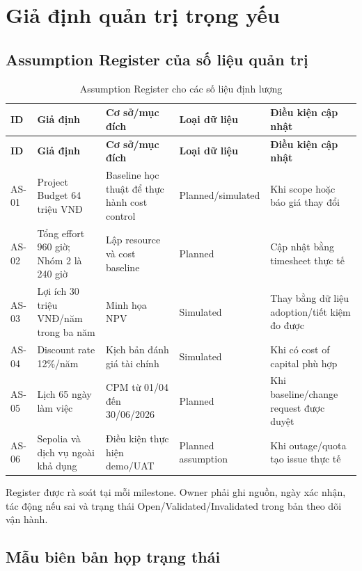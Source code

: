 \fi
\section{Giả định quản trị trọng yếu}

\subsection{Assumption Register của số liệu quản trị}

\begin{landscape}
\begin{longtable}{p{1.3cm}p{5.2cm}p{5cm}p{3.5cm}p{4.5cm}}
\caption{Assumption Register cho các số liệu định lượng}\label{tab:assumption-register}\\
\toprule
\textbf{ID} & \textbf{Giả định} & \textbf{Cơ sở/mục đích} & \textbf{Loại dữ liệu} & \textbf{Điều kiện cập nhật} \\
\midrule
\endfirsthead
\toprule
\textbf{ID} & \textbf{Giả định} & \textbf{Cơ sở/mục đích} & \textbf{Loại dữ liệu} & \textbf{Điều kiện cập nhật} \\
\midrule
\endhead
AS-01 & Project Budget 64 triệu VNĐ & Baseline học thuật để thực hành cost control & Planned/simulated & Khi scope hoặc báo giá thay đổi \\
AS-02 & Tổng effort 960 giờ; Nhóm 2 là 240 giờ & Lập resource và cost baseline & Planned & Cập nhật bằng timesheet thực tế \\
AS-03 & Lợi ích 30 triệu VNĐ/năm trong ba năm & Minh họa NPV & Simulated & Thay bằng dữ liệu adoption/tiết kiệm đo được \\
AS-04 & Discount rate 12\%/năm & Kịch bản đánh giá tài chính & Simulated & Khi có cost of capital phù hợp \\
AS-05 & Lịch 65 ngày làm việc & CPM từ 01/04 đến 30/06/2026 & Planned & Khi baseline/change request được duyệt \\
AS-06 & Sepolia và dịch vụ ngoài khả dụng & Điều kiện thực hiện demo/UAT & Planned assumption & Khi outage/quota tạo issue thực tế \\
\bottomrule
\end{longtable}
\end{landscape}

Register được rà soát tại mỗi milestone. Owner phải ghi nguồn, ngày xác nhận, tác động nếu sai và trạng thái Open/Validated/Invalidated trong bản theo dõi vận hành.

\iffalse
\subsection{Mẫu biên bản họp trạng thái}

